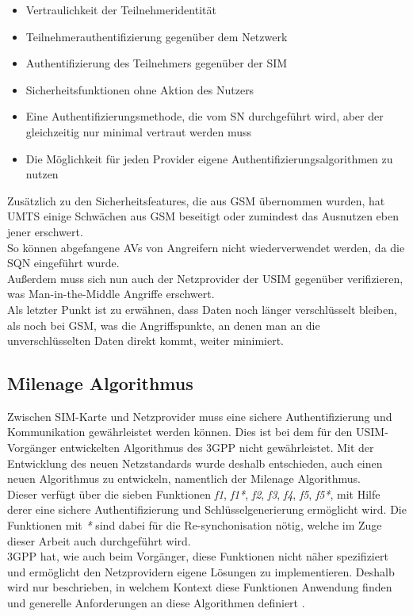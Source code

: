  \begin{itemize}
  \item Vertraulichkeit der Teilnehmeridentität
  \item Teilnehmerauthentifizierung gegenüber dem Netzwerk
  \item Authentifizierung des Teilnehmers gegenüber der SIM
  \item Sicherheitsfunktionen ohne Aktion des Nutzers
  \item Eine Authentifizierungsmethode, die vom \ac{SN} durchgeführt wird, aber der gleichzeitig nur minimal vertraut werden muss
  \item Die Möglichkeit für jeden Provider eigene Authentifizierungsalgorithmen zu nutzen
 \end{itemize}
 
 Zusätzlich zu den Sicherheitsfeatures, die aus GSM übernommen wurden, hat UMTS einige
 Schwächen aus GSM beseitigt oder zumindest das Ausnutzen eben jener erschwert. \\
 So können abgefangene \acp{AV} von Angreifern nicht wiederverwendet werden, da
 die SQN eingeführt wurde. \cite{putz01}\\
 Außerdem muss sich nun auch der Netzprovider der USIM gegenüber verifizieren, was
 Man-in-the-Middle Angriffe erschwert. \cite{putz01} \\
 Als letzter Punkt ist zu erwähnen, dass Daten noch länger verschlüsselt bleiben, als noch
 bei GSM, was die Angriffspunkte, an denen man an die unverschlüsselten Daten direkt
 kommt, weiter minimiert. \cite{spitz11}

\subsection[Milenage Algorithmus (Heumann)]{Milenage Algorithmus}
\label{milenage}
Zwischen \ac{SIM}-Karte und Netzprovider muss eine sichere Authentifizierung und
Kommunikation gewährleistet werden können. Dies ist bei dem für den USIM-Vorgänger
entwickelten Algorithmus des \ac{3GPP} nicht
gewährleistet. Mit der Entwicklung des neuen Netzstandards wurde deshalb entschieden,
auch einen neuen Algorithmus zu entwickeln, namentlich der Milenage Algorithmus. \\
Dieser verfügt über die sieben Funktionen \emph{f1}, \emph{f1*}, \emph{f2}, \emph{f3},
\emph{f4}, \emph{f5}, \emph{f5*}, mit Hilfe derer eine sichere Authentifizierung und
Schlüsselgenerierung ermöglicht wird. Die Funktionen mit \emph{*} sind dabei für die
Re-synchonisation nötig, welche im Zuge dieser Arbeit auch durchgeführt wird. \\
3GPP hat, wie auch beim Vorgänger, diese Funktionen nicht näher spezifiziert und ermöglicht
den Netzprovidern eigene Lösungen zu implementieren. Deshalb wird nur beschrieben, in
welchem Kontext diese Funktionen Anwendung finden und generelle Anforderungen
an diese Algorithmen definiert \cite{3gpp.35.205}.

